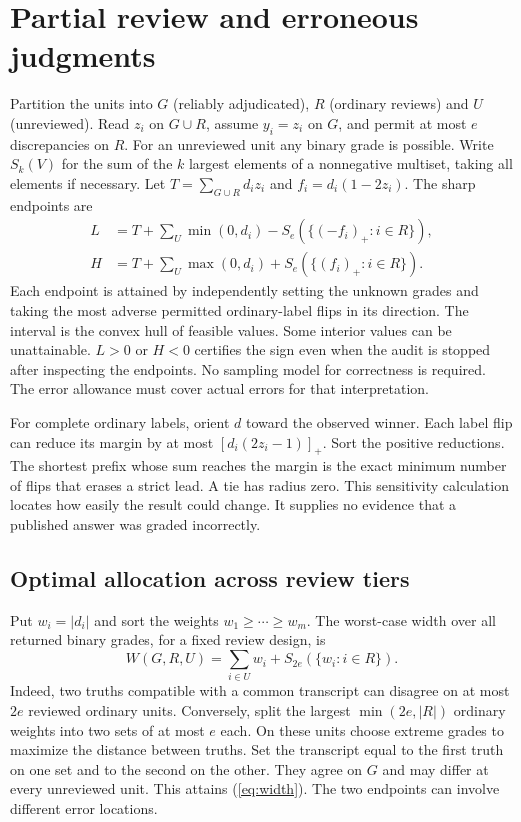 \documentclass[11pt]{article}
\begin{document}
\section{Partial review and erroneous judgments}
Partition the units into $G$ (reliably adjudicated), $R$ (ordinary reviews) and $U$ (unreviewed). Read $z_i$ on $G\cup R$, assume $y_i=z_i$ on $G$, and permit at most $e$ discrepancies on $R$. For an unreviewed unit any binary grade is possible. Write $S_k(V)$ for the sum of the $k$ largest elements of a nonnegative multiset, taking all elements if necessary. Let $T=\sum_{G\cup R} d_i z_i$ and $f_i=d_i(1-2z_i)$. The sharp endpoints are
\begin{align*}
 L &= T+\sum_{U}\min(0,d_i)-S_e(\{(-f_i)_+:i\in R\}),\\
 H &= T+\sum_{U}\max(0,d_i)+S_e(\{(f_i)_+:i\in R\}).
\end{align*}
Each endpoint is attained by independently setting the unknown grades and taking the most adverse permitted ordinary-label flips in its direction. The interval is the convex hull of feasible values. Some interior values can be unattainable. $L>0$ or $H<0$ certifies the sign even when the audit is stopped after inspecting the endpoints. No sampling model for correctness is required. The error allowance must cover actual errors for that interpretation.

For complete ordinary labels, orient $d$ toward the observed winner. Each label flip can reduce its margin by at most $[d_i(2z_i-1)]_+$. Sort the positive reductions. The shortest prefix whose sum reaches the margin is the exact minimum number of flips that erases a strict lead. A tie has radius zero. This sensitivity calculation locates how easily the result could change. It supplies no evidence that a published answer was graded incorrectly.

\subsection{Optimal allocation across review tiers}
Put $w_i=|d_i|$ and sort the weights $w_1\geq\cdots\geq w_m$. The worst-case width over all returned binary grades, for a fixed review design, is
\begin{equation}
 W(G,R,U)=\sum_{i\in U}w_i + S_{2e}(\{w_i:i\in R\}). \label{eq:width}
\end{equation}
Indeed, two truths compatible with a common transcript can disagree on at most $2e$ reviewed ordinary units. Conversely, split the largest $\min(2e,|R|)$ ordinary weights into two sets of at most $e$ each. On these units choose extreme grades to maximize the distance between truths. Set the transcript equal to the first truth on one set and to the second on the other. They agree on $G$ and may differ at every unreviewed unit. This attains (\ref{eq:width}). The two endpoints can involve different error locations.
\end{document}
